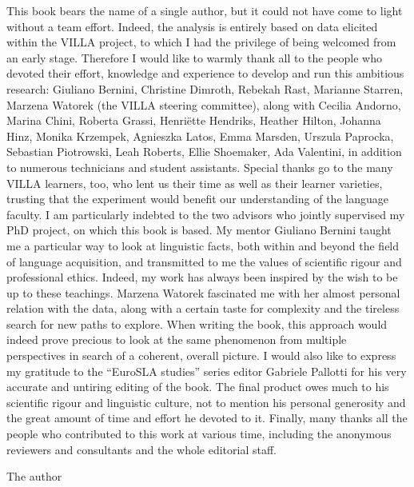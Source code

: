 
This book bears the name of a single author, but it could not have come to light without a team effort. Indeed, the analysis is entirely based on data elicited within the VILLA project, to which I had the privilege of being welcomed from an early stage. Therefore I would like to warmly thank all to the people who devoted their effort, knowledge and experience to develop and run this ambitious research: Giuliano Bernini, Christine Dimroth, Rebekah Rast, Marianne Starren, Marzena Watorek (the VILLA steering committee), along with Cecilia Andorno, Marina Chini, Roberta Grassi, Henriëtte Hendriks, Heather Hilton, Johanna Hinz, Monika Krzempek, Agnieszka Latos, Emma Marsden, Urszula Paprocka, Sebastian Piotrowski, Leah Roberts, Ellie Shoemaker, Ada Valentini, in addition to numerous technicians and student assistants. Special thanks go to the many VILLA learners, too, who lent us their time as well as their learner varieties, trusting that the experiment would benefit our understanding of the language faculty.
I am particularly indebted to the two advisors who jointly supervised my PhD project, on which this book is based. My mentor Giuliano Bernini taught me a particular way to look at linguistic facts, both within and beyond the field of language acquisition, and transmitted to me the values of scientific rigour and professional ethics. Indeed, my work has always been inspired by the wish to be up to these teachings. Marzena Watorek fascinated me with her almost personal relation with the data, along with a certain taste for complexity and the tireless search for new paths to explore. When writing the book, this approach would indeed prove precious to look at the same phenomenon from multiple perspectives in search of a coherent, overall picture.
I would also like to express my gratitude to the “EuroSLA studies” series editor Gabriele Pallotti for his very accurate and untiring editing of the book. The final product owes much to his scientific rigour and linguistic culture, not to mention his personal generosity and the great amount of time and effort he devoted to it. Finally, many thanks all the people who contributed to this work at various time, including the anonymous reviewers and consultants and the whole editorial staff.

The author
